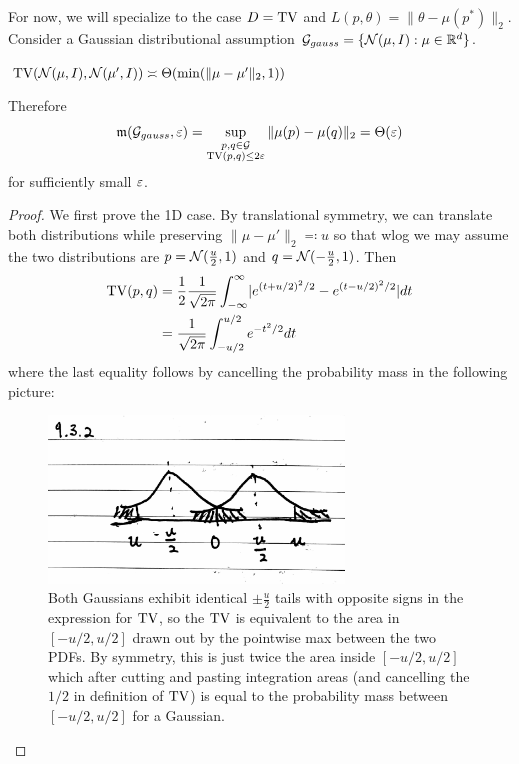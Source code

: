For now, we will specialize to the case $D = \operatorname{TV}$ and $L(p,  \theta) = \|\theta - \mu(p^*)\|_2$.
Consider a Gaussian distributional assumption $\mathcal{G}_{gauss} = \{\mathcal{N}(\mu, I) : \mu \in \mathbb{R}^{d}\}$.

\begin{lemma}\label{lem:gauss-tv}
    $\operatorname{TV}(\mathcal{N}(\mu, I), \mathcal{N}(\mu', I)) \asymp \Theta(\min(\|\mu - \mu'\|_2, 1))$
    
    Therefore
    \begin{align}
         \mathfrak{m}(\mathcal{G}_{gauss}, \varepsilon) = \sup_{\substack{p,q \in \mathcal{G}\\ \operatorname{TV}(p,q) \leq 2 \varepsilon}} \|\mu(p) - \mu(q)\|_2 = \Theta(\varepsilon)   
    \end{align}
    for sufficiently small $\varepsilon$.
\end{lemma}

\begin{proof}
    We first prove the 1D case. By translational symmetry, we can translate both
    distributions while preserving $\|\mu - \mu'\|_2 \eqqcolon u$ so that wlog we may
    assume the two distributions are $p = \mathcal{N}(\frac{u}{2}, 1)$ and $q = \mathcal{N}(-\frac{u}{2}, 1)$.
    Then
    \begin{align}
        \operatorname{TV}(p,q)
        &= \frac{1}{2} \frac{1}{\sqrt{2\pi}} \int_{-\infty}^\infty \lvert e^{(t + u/2)^2/2} - e^{(t-u/2)^2/2}\rvert dt \\
        &= \frac{1}{\sqrt{2\pi}} \int_{-u/2}^{u/2} e^{-t^2/2} dt \label{eq:9-3-int}
    \end{align}
    where the last equality follows by cancelling the probability mass in the following picture:
    \begin{figure}[H]
        \centering
        \includegraphics[width=0.7\textwidth]{figures/9-3-2.png}
        \caption{Both Gaussians exhibit identical $\pm \frac{u}{2}$ tails with opposite signs
            in the expression for $\operatorname{TV}$, so the $\operatorname{TV}$ is equivalent to the area in $[-u/2, u/2]$ drawn
            out by the pointwise max between the two PDFs. By symmetry, this is just twice the area
            inside $[-u/2, u/2]$ which after cutting and pasting integration areas (and cancelling the $1/2$
            in definition of $\operatorname{TV}$) is equal
            to the probability mass between $[-u/2,u/2]$ for a Gaussian.}
    \end{figure}
  

\end{proof}
